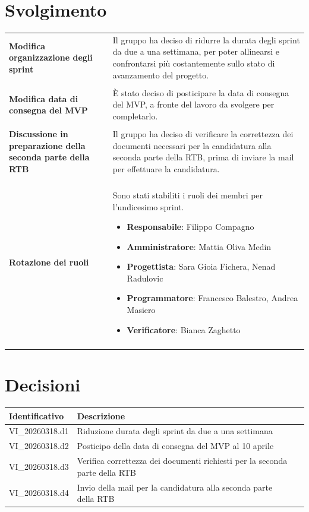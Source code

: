 \documentclass[a4paper,12pt]{article}
\begin{document}
    \section{Svolgimento} {
        \begin{longtable}{P{5cm}|P{10cm}} 
            \textbf{Modifica organizzazione degli sprint} & Il gruppo ha deciso di ridurre la durata degli sprint da due a una settimana, per poter allinearsi e confrontarsi più costantemente sullo stato di avanzamento del progetto.\\\\
            \textbf{Modifica data di consegna del MVP} & È stato deciso di posticipare la data di consegna del MVP, a fronte del lavoro da svolgere per completarlo.\\\\
            \textbf{Discussione in preparazione della seconda parte della RTB} & Il gruppo ha deciso di verificare la correttezza dei documenti necessari per la candidatura alla seconda parte della RTB, prima di inviare la mail per effettuare la candidatura.\\\\
            \textbf{Rotazione dei ruoli} & Sono stati stabiliti i ruoli dei membri per l'undicesimo sprint.
            \begin{itemize}
                \item \textbf{Responsabile}: Filippo Compagno
                \item \textbf{Amministratore}: Mattia Oliva Medin
                \item \textbf{Progettista}: Sara Gioia Fichera, Nenad Radulovic
                \item \textbf{Programmatore}: Francesco Balestro, Andrea Masiero
                \item \textbf{Verificatore}: Bianca Zaghetto
            \end{itemize}\\\\
        \end{longtable}
    }

    \section{Decisioni} {
        \begin{tabularx}{\textwidth}{|l|X|l|}
            \hline
            \textbf{Identificativo} & \textbf{Descrizione}\\
            \hline
            VI\_20260318.d1 & Riduzione durata degli sprint da due a una settimana\\
            \hline
            VI\_20260318.d2 & Posticipo della data di consegna del MVP al 10 aprile\\
            \hline
            VI\_20260318.d3 & Verifica correttezza dei documenti richiesti per la seconda parte della RTB\\
            \hline
            VI\_20260318.d4 & Invio della mail per la candidatura alla seconda parte della RTB\\
            \hline
        \end{tabularx}
    }
\end{document}
